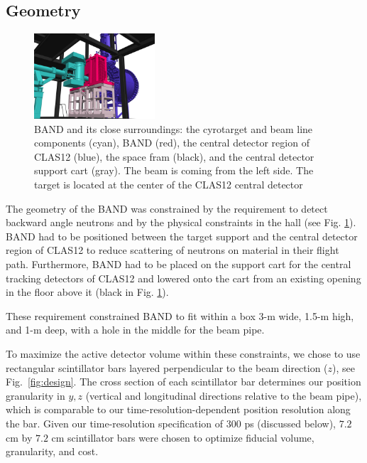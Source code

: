 \documentclass[3p,final,twocolumn]{elsarticle}
\begin{document}
\subsection{Geometry}
\begin{figure}[tb]
	\centering
		\includegraphics[width=0.40\textwidth]{FULL_CONTEXT_STUDIE_3.png}
		\vspace{0.5cm}
	    \caption{BAND and its close surroundings: the
                  cyrotarget and beam line components (cyan),  BAND
                  (red), the central detector region of CLAS12
                  (blue), the space fram (black), and the central detector support cart (gray). The beam is coming from the left side. The
                  target is located at the center of the CLAS12 central detector}
		\label{fig:bandtarget}
		
\end{figure}

The geometry of the BAND was constrained by the requirement to detect
backward angle neutrons and by the physical constraints in the hall (see 
Fig. \ref{fig:bandtarget}). BAND had to be positioned between the
target support and the central detector region of CLAS12 to reduce
scattering of neutrons on material in their flight path. Furthermore,
BAND had to be placed on the support cart for the central tracking
detectors of CLAS12 and lowered
onto the cart from an existing opening in the floor above it (black in Fig. \ref{fig:bandtarget}).

These requirement constrained BAND to fit within a
box 3-\si{\meter} wide, 1.5-\si{\meter} high, and 1-\si{\meter}
deep, with a hole in the middle for the beam pipe.

To maximize the active detector volume within these constraints, we
chose to use rectangular scintillator bars layered perpendicular to
the beam direction ($z$), see Fig.~\ref{fig:design}.  The cross
section of each scintillator bar determines our position granularity
in $y,z$ (vertical and longitudinal directions relative to the beam
pipe), which is comparable to our time-resolution-dependent position
resolution along the bar. Given our time-resolution specification of
$300$ \si{\pico\second} (discussed below), $7.2$
\si{\centi\meter} by $7.2$ \si{\centi\meter} scintillator bars were
chosen to optimize fiducial volume, granularity, and cost.
\end{document}
